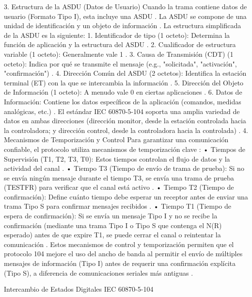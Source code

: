 \documentclass[a5paper]{book}%
\begin{document}
3. Estructura de la ASDU (Datos de Usuario)
Cuando la trama contiene datos de usuario (Formato Tipo I), esta incluye una ASDU
. La ASDU se compone de una unidad de identificación y un objeto de información
.
La estructura simplificada de la ASDU es la siguiente:
1. Identificador de tipo (1 octeto): Determina la función de aplicación y la estructura del ASDU
.
2. Cualificador de estructura variable (1 octeto): Generalmente vale 1
.
3. Causa de Transmisión (CDT) (1 octeto): Indica por qué se transmite el mensaje (e.g., "solicitada", "activación", "confirmación")
.
4. Dirección Común del ASDU (2 octetos): Identifica la estación terminal (ET) con la que se intercambia la información
.
5. Dirección del Objeto de Información (1 octeto): A menudo vale 0 en ciertas aplicaciones
.
6. Datos de Información: Contiene los datos específicos de la aplicación (comandos, medidas analógicas, etc.)
.
El estándar IEC 60870-5-104 soporta una amplia variedad de datos en ambas direcciones (dirección monitor, desde la estación controlada hacia la controladora; y dirección control, desde la controladora hacia la controlada)
.
4. Mecanismos de Temporización y Control
Para garantizar una comunicación confiable, el protocolo utiliza mecanismos de temporización clave
:
• Tiempos de Supervisión (T1, T2, T3, T0): Estos tiempos controlan el flujo de datos y la actividad del canal
.
• Tiempo T3 (Tiempo de envío de trama de prueba): Si no se envía ningún mensaje durante el tiempo T3, se envía una trama de prueba (TESTFR) para verificar que el canal está activo
.
• Tiempo T2 (Tiempo de confirmación): Define cuánto tiempo debe esperar un receptor antes de enviar una trama Tipo S para confirmar mensajes recibidos
.
• Tiempo T1 (Tiempo de espera de confirmación): Si se envía un mensaje Tipo I y no se recibe la confirmación (mediante una trama Tipo I o Tipo S que contenga el N(R) esperado) antes de que expire T1, se puede cerrar el canal o reintentar la comunicación
.
Estos mecanismos de control y temporización permiten que el protocolo 104 mejore el uso del ancho de banda al permitir el envío de múltiples mensajes de información (Tipo I) antes de requerir una confirmación explícita (Tipo S), a diferencia de comunicaciones seriales más antiguas
.

Intercambio de Estados Digitales IEC 60870-5-104
\end{document}
